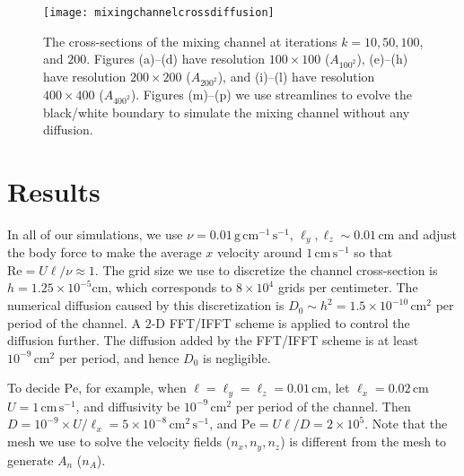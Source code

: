   \begin{figure}
    \centerline{
    \texttt{[image: mixingchannelcrossdiffusion]}}
    \caption{The cross-sections of the mixing channel at iterations $k=10, 50, 100$, and $200$. Figures (a)--(d) have resolution $100 \times 100$ ($A_{100^2}$), (e)--(h) have resolution $200 \times 200$ ($A_{200^2}$), and (i)--(l) have resolution $400 \times 400$ ($A_{400^2}$). Figures (m)--(p) we use streamlines to evolve the black/white boundary to simulate the mixing channel without any diffusion.}
  \label{mixingcrosssection}
  \end{figure}



\section{Results}
\label{sec:topoptresults}

In all of our simulations, we use $\nu = 0.01 \, \text{g}
\,\text{cm}^{-1}\, \text{s}^{-1}$, $\ell_y,\ell_z \sim 0.01\,\text{cm}$ and
adjust the body force to make the average $x$ velocity around
$1\,\text{cm}\, \text{s}^{-1}$ so that $\text{Re} =U\ell/\nu\approx 1$.
The grid size we use to discretize the channel cross-section is
$h=1.25\times 10^{-5}\text{cm}$, which corresponds to $8 \times 10^4$ grids per
centimeter. The numerical diffusion caused by this discretization is
$D_0 \sim h^2 =1.5\times 10^{-10}\,\text{cm}^2$ per period of the
channel. A $2$-D FFT/IFFT scheme is applied to control the
diffusion further. The diffusion added by the FFT/IFFT scheme is at least
$10^{-9}\,\text{cm}^2$ per period, and hence $D_0$ is negligible.

To decide $\text{Pe}$, for example, when $\ell=\ell_y=\ell_z=0.01\,\text{cm}$,
let $\ell_x =0.02 \,\text{cm}$ $U=1 \, \text{cm} \, \text{s}^{-1}$, and
diffusivity be $10^{-9}\,\text{cm}^2$ per period of the channel. Then
$D = 10^{-9}\times U/\ell_x =
5\times10^{-8}\,\text{cm}^2\,\text{s}^{-1}$, and $\text{Pe} = U\ell/D =
2\times10^5$. Note that the mesh we use to solve the velocity fields
($n_x,n_y,n_z$) is different from the mesh to generate $A_n$ ($n_A$).


